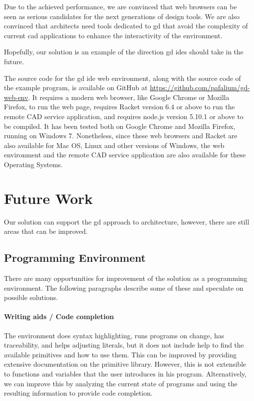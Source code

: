 Due to the achieved performance, we are convinced that web browsers can be seen as serious candidates for the next generations of design tools.
We are also convinced that architects need tools dedicated to \gls{gd} that avoid the complexity of current \gls{cad} applications to enhance the interactivity of the environment.

Hopefully, our solution is an example of the direction \gls{gd} \glspl{ide} should take in the future.

The source code for the \gls{gd} \gls{ide} web environment, along with the source code of the example program, is available on GitHub at \url{https://github.com/pafalium/gd-web-env}.
It requires a modern web browser, like Google Chrome or Mozilla Firefox, to run the web page, requires Racket version 6.4 or above to run the remote CAD service application, and requires node.js version 5.10.1 or above to be compiled.
It has been tested both on Google Chrome and Mozilla Firefox, running on Windows 7.
Nonetheless, since these web browsers and Racket are also available for Mac OS, Linux and other versions of Windows, the web environment and the remote CAD service application are also available for these Operating Systems.


\section{Future Work}
Our solution can support the \gls{gd} approach to architecture, however, there are still areas that can be improved.


\subsection{Programming Environment}
There are many opportunities for improvement of the solution as a programming environment.
The following paragraphs describe some of these and speculate on possible solutions.

\paragraph{Writing aids / Code completion}
The environment does syntax highlighting, runs programs on change, has traceability, and helps adjusting literals, but it does not include help to find the available primitives and how to use them.
This can be improved by providing extensive documentation on the primitive library.
However, this is not extensible to functions and variables that the user introduces in his program.
Alternatively, we can improve this by analyzing the current state of programs and using the resulting information to provide code completion.

